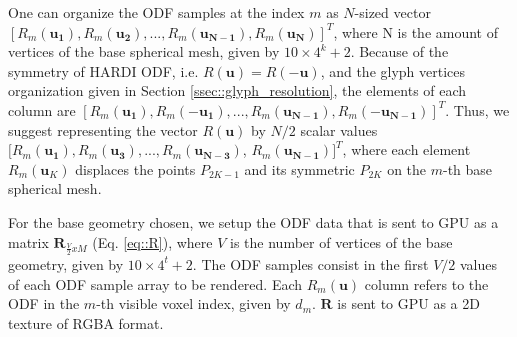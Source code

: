 \documentclass[twoside,twocolumn,10pt]{article}
\begin{document}



One can organize the ODF samples at the index $m$ as $N$-sized vector $[R_m(\bm{u_1}), R_m(\bm{u_2}), ..., R_m(\bm{u_{N-1}}), R_m(\bm{u_{N}})]^T$, where N is the amount of vertices of the base spherical mesh, given by $10\times 4^k + 2$. Because of the symmetry of HARDI ODF, i.e. $R(\bm{u}) = R(-\bm{u})$, and the glyph vertices organization given in Section \ref{ssec::glyph_resolution}, the elements of each column are $[R_m(\bm{u_1}), R_m(-\bm{u_1}), ..., R_m(\bm{u_{N-1}}), R_m(-\bm{u_{N-1}})]^T$. Thus, we suggest  representing the vector $R(\bm{u})$ by $N/2$ scalar values $[R_m(\bm{u_1}), R_m(\bm{u_3}), ..., R_m(\bm{u_{N-3}})$, $R_m(\bm{u_{N-1}})]^T$, where each element $R_m(\bm{u}_{K})$ displaces the points $P_{2K-1}$ and its symmetric $P_{2K}$ on the $m$-th base spherical mesh.


For the base geometry chosen, we setup the ODF data that is sent to GPU as a matrix $\bm{R}_{\frac{V}{2}xM}$ (Eq. \ref{eq::R}), where $V$ is the number of vertices of the base geometry, given by $10 \times 4^t + 2$. The ODF samples consist in the first $V/2$ values of each ODF sample array to be rendered. Each $R_m(\bm{u})$ column refers to the ODF in the $m$-th visible voxel index, given by $d_m$. $\bm{R}$ is sent to GPU as a 2D texture of RGBA format.

\end{document}
